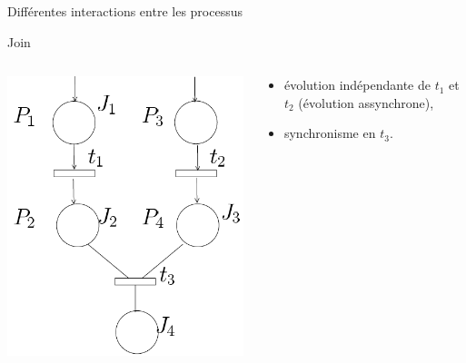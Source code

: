 \documentclass[compress]{beamer}
\begin{document}
\begin{frame}{Différentes interactions entre les processus}
\begin{block}{Join}
\begin{columns}
	\begin{column}{.3\linewidth}
		\begin{center}
			\includegraphics[width=\linewidth]{jun}
		\end{center}
	\end{column}
	\begin{column}{.7\linewidth}
		\begin{itemize}
		\item évolution indépendante de $t_1$ et $t_2$ (évolution assynchrone),
		\item synchronisme en $t_3$.
		\end{itemize}
	\end{column}
\end{columns}
\end{block}
\end{frame}
\end{document}
